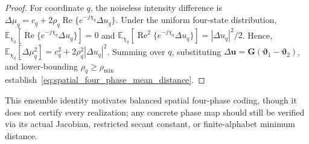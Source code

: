 \documentclass[journal]{IEEEtran}
\begin{document}
\begin{proof}
For coordinate $q$, the noiseless intensity difference is $\Delta\mu_q = c_q + 2\rho_q \operatorname{Re}\{e^{-j\chi_q}\Delta u_q\}$. Under the uniform four-state distribution, $\mathbb{E}_{\chi_q}[\operatorname{Re}\{e^{-j\chi_q}\Delta u_q\}] = 0$ and $\mathbb{E}_{\chi_q}[\operatorname{Re}^{2}\{e^{-j\chi_q}\Delta u_q\}] = |\Delta u_q|^{2}/2$. Hence, $\mathbb{E}_{\chi_q}[\Delta\mu_q^{2}] = c_q^{2} + 2\rho_q^{2}|\Delta u_q|^{2}$. Summing over $q$, substituting $\Delta\mathbf{u} = \mathbf{G}(\boldsymbol{\vartheta}_1 - \boldsymbol{\vartheta}_2)$, and lower-bounding $\rho_q \ge \rho_{\min}$ establish~\eqref{eq:spatial_four_phase_mean_distance}.
\end{proof}

This ensemble identity motivates balanced spatial four-phase coding, though it does not certify every realization; any concrete phase map should still be verified via its actual Jacobian, restricted secant constant, or finite-alphabet minimum distance.
\end{document}
